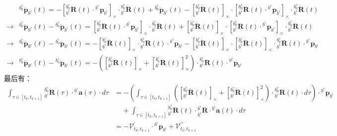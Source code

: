\documentclass[12pt, onecolumn]{article}
\newcommand\liehat[1]{\left[ #1 \right]_\times}
\begin{document}
	\begin{equation}
	\begin{aligned}
	&{^{b^c_0}\ddot{\boldsymbol{p}}_{b^i}(t)}=
	-\liehat{{^{b^c_0}_{b^c}\boldsymbol{R}(t)}\cdot{^{b^c}\boldsymbol{p}_{b^i}}}\cdot
	{^{b^c_0}_{b^c}\ddot{\boldsymbol{R}}(t)}+{^{b^c_0}\ddot{\boldsymbol{p}}_{b^c}(t)}
	-\liehat{{^{b^c_0}_{b^c}\dot{\boldsymbol{R}}(t)}}\cdot
	\liehat{{^{b^c_0}_{b^c}\boldsymbol{R}(t)}\cdot{^{b^c}\boldsymbol{p}_{b^i}}}\cdot{^{b^c_0}_{b^c}\dot{\boldsymbol{R}}(t)}
	\\
	\to&
	{^{b^c_0}\ddot{\boldsymbol{p}}_{b^c}(t)}-{^{b^c_0}\ddot{\boldsymbol{p}}_{b^i}(t)}=
	\liehat{{^{b^c_0}_{b^c}\boldsymbol{R}(t)}\cdot{^{b^c}\boldsymbol{p}_{b^i}}}\cdot
	{^{b^c_0}_{b^c}\ddot{\boldsymbol{R}}(t)}
	+\liehat{{^{b^c_0}_{b^c}\dot{\boldsymbol{R}}(t)}}\cdot
	\liehat{{^{b^c_0}_{b^c}\boldsymbol{R}(t)}\cdot{^{b^c}\boldsymbol{p}_{b^i}}}\cdot{^{b^c_0}_{b^c}\dot{\boldsymbol{R}}(t)}
	\\
	\to&{^{b^c_0}\ddot{\boldsymbol{p}}_{b^c}(t)}-{^{b^c_0}\ddot{\boldsymbol{p}}_{b^i}(t)}=
	-\liehat{{^{b^c_0}_{b^c}\ddot{\boldsymbol{R}}(t)}}\cdot{^{b^c_0}_{b^c}\boldsymbol{R}(t)}
	\cdot{^{b^c}\boldsymbol{p}_{b^i}}
	-\liehat{{^{b^c_0}_{b^c}\dot{\boldsymbol{R}}(t)}}\cdot
	\liehat{{^{b^c_0}_{b^c}\dot{\boldsymbol{R}}(t)}}\cdot{^{b^c_0}_{b^c}\boldsymbol{R}(t)}
	\cdot{^{b^c}\boldsymbol{p}_{b^i}}
	\\
	\to&{^{b^c_0}\ddot{\boldsymbol{p}}_{b^c}(t)}-{^{b^c_0}\ddot{\boldsymbol{p}}_{b^i}(t)}=
	-\left(\liehat{{^{b^c_0}_{b^c}\ddot{\boldsymbol{R}}(t)}}
	+\liehat{{^{b^c_0}_{b^c}\dot{\boldsymbol{R}}(t)}}^2\right) \cdot{^{b^c_0}_{b^c}\boldsymbol{R}(t)}\cdot{^{b^c}\boldsymbol{p}_{b^i}}
	\end{aligned}
	\end{equation}
	最后有：
	\begin{equation}
	\begin{aligned}
	\int_{\tau\in[t_k,t_{k+1}]}{^{b_0^c}_{b^c}\boldsymbol{R}(\tau)}\cdot{^{b^c}\boldsymbol{a}(\tau)}\cdot d\tau&=
	-\left( \int_{\tau\in[t_k,t_{k+1}]}\left(\liehat{{^{b^c_0}_{b^c}\ddot{\boldsymbol{R}}(t)}}
	+\liehat{{^{b^c_0}_{b^c}\dot{\boldsymbol{R}}(t)}}^2\right) \cdot{^{b^c_0}_{b^c}\boldsymbol{R}(t)}\cdot d\tau\right) \cdot{^{b^c}\boldsymbol{p}_{b^i}}
	\\
	&\;\;\;\;+\int_{\tau\in[t_k,t_{k+1}]}{^{b^c_0}_{b^c}\boldsymbol{R}(t)}\cdot{^{b^c}_{b^i}\boldsymbol{R}}\cdot{^{b^i}\boldsymbol{a}(t)}\cdot d\tau
	\\&=-\mathcal{V}_{t_k,t_{k+1}}^{\prime}\cdot{^{b^c}\boldsymbol{p}_{b^i}}+
	\mathcal{V}_{t_k,t_{k+1}}^{\prime\prime}
	\end{aligned}
	\end{equation}
	
\end{document}
